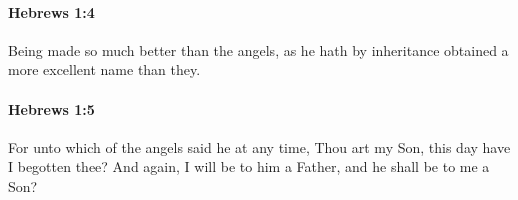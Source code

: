 		\paragraph{Hebrews 1:4} %
			\label{HEBREWS-1-4}

			Being made so much better than the angels, as he hath by inheritance obtained a more excellent name than they.

			\begin{framed}
			\scriptsize
				\begin{compactdesc}
					\item[SBLG] 
				\end{compactdesc}
			\end{framed}

		\paragraph{Hebrews 1:5} %
			\label{HEBREWS-1-5}

			For unto which of the angels said he at any time, Thou art my Son, this day have I begotten thee? And again, I will be to him a Father, and he shall be to me a Son?

